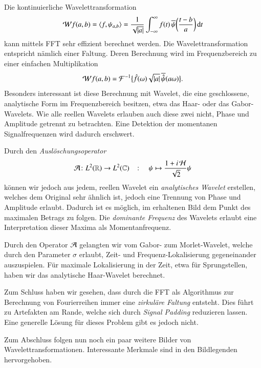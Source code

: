 Die kontinuierliche Wavelettransformation 
\begin{equation}
\Wave f (a,b)
=
\langle f,\psi_{a,b}\rangle
=
\frac{1}{\sqrt{|a|}}\int_{-\infty}^\infty f(t)\,
\overline{\psi}\biggl(\frac{t-b}{a}\biggr)\,\mathrm{d}t
\end{equation}
kann mittels FFT sehr effizient berechnet werden.
Die Wavelettransformation entspricht nämlich einer Faltung.
Deren Berechnung wird im Frequenzbereich zu einer einfachen Multiplikation
\begin{equation}
\Wave f(a,b)
= \mathcal{F}^{-1}\bigl\lbrace\hat{f}(\omega) \sqrt{|a|}\, \overline{\hat{\psi}}(a\omega)\bigr\rbrace.
\end{equation}
Besonders interessant ist diese Berechnung mit Wavelet, die eine geschlossene, analytische Form im Frequenzbereich besitzen, etwa das Haar- oder das Gabor-Wavelets.
Wie alle reellen Wavelets erlauben auch diese zwei nicht, Phase und Amplitude getrennt zu betrachten.
Eine Detektion der momentanen Signalfrequenzen wird dadurch erschwert.

Durch den \emph{Auslöschungsoperator}
\[
	\Ana\, \colon L^2(\mathbb R) \to L^2(\mathbb C)
	\quad\colon\quad
	\psi \mapsto \frac{1 + i\Hilb\,}{\sqrt 2}\psi
\]
können wir jedoch aus jedem, reellen Wavelet ein \emph{analytisches Wavelet} erstellen, welches dem Original sehr ähnlich ist, jedoch eine Trennung von Phase und Amplitude erlaubt.
Dadurch ist es möglich, im erhaltenen Bild dem Punkt des maximalen Betrags zu folgen.
Die \emph{dominante Frequenz} des Wavelets erlaubt eine Interpretation dieser Maxima als Momentanfrequenz.

Durch den Operator $\Ana\,$ gelangten wir vom Gabor- zum Morlet-Wavelet, welche durch den Parameter $\sigma$ erlaubt, Zeit- und Frequenz-Lokalisierung gegeneinander auszuspielen.
Für maximale Lokalisierung in der Zeit, etwa für Sprungstellen, haben wir das analytische Haar-Wavelet berechnet.

Zum Schluss haben wir gesehen, dass durch die FFT als Algorithmus zur Berechnung von Fourierreihen immer eine \emph{zirkuläre Faltung} entsteht.
Dies führt zu Artefakten am Rande, welche sich durch \emph{Signal Padding} reduzieren lassen.
Eine generelle Lösung für dieses Problem gibt es jedoch nicht.

Zum Abschluss folgen nun noch ein paar weitere Bilder von Wavelettransformationen.
Interessante Merkmale sind in den Bildlegenden hervorgehoben.


